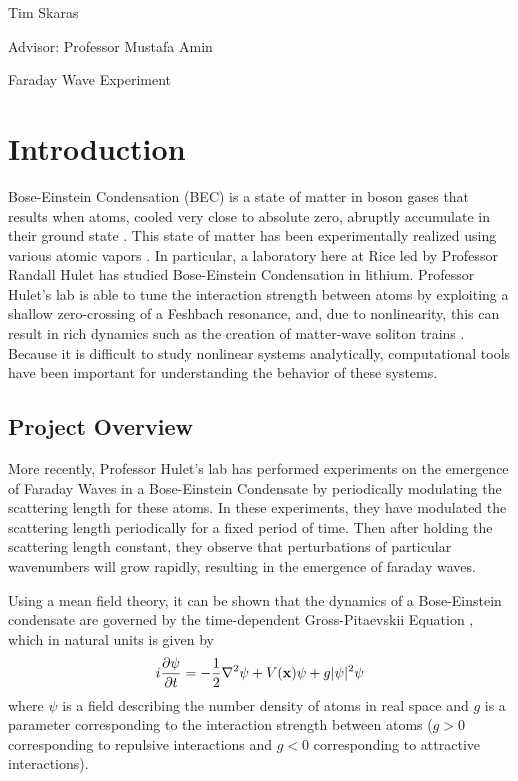 \documentclass[12]{article}
\begin{document}
\begin{flushright}
Tim Skaras

Advisor: Professor Mustafa Amin
\end{flushright}

\begin{center}
{\LARGE Faraday Wave Experiment}
\end{center}

\section{Introduction}

Bose-Einstein Condensation (BEC) is a state of matter in boson gases that results when atoms, cooled very close to absolute zero, abruptly accumulate in their ground state \cite{schroeder1999introduction}. This state of matter has been experimentally realized using various atomic vapors \cite{pethick2008bose}. In particular, a laboratory here at Rice led by Professor Randall Hulet has studied Bose-Einstein Condensation in lithium. Professor Hulet's lab is able to tune the interaction strength between atoms by exploiting a shallow zero-crossing of a Feshbach resonance, and, due to nonlinearity, this can result in rich dynamics such as the creation of matter-wave soliton trains \cite{nguyen2017formation}. Because it is difficult to study nonlinear systems analytically, computational tools have been important for understanding the behavior of these systems.\\

\subsection{Project Overview}

More recently, Professor Hulet's lab has performed experiments on the emergence of Faraday Waves in a Bose-Einstein Condensate by periodically modulating the scattering length for these atoms. In these experiments, they have modulated the scattering length periodically for a fixed period of time. Then after holding the scattering length constant, they observe that perturbations of particular wavenumbers will grow rapidly, resulting in the emergence of faraday waves.

Using a mean field theory, it can be shown that the dynamics of a Bose-Einstein condensate are governed by the time-dependent Gross-Pitaevskii Equation \cite{pethick2008bose}, which in natural units is given by
\begin{equation}
i \pdv{\psi}{t} = -\frac{1}{2}\laplacian{\psi} + V(\vb{x})\psi + g |\psi|^2 \psi
\label{GPE3D}
\end{equation}
\nolinebreak
where $\psi$ is a field describing the number density of atoms in real space and $g$ is a parameter corresponding to the interaction strength between atoms ($g>0$ corresponding to repulsive interactions and $g < 0$ corresponding to attractive interactions).
\end{document}
